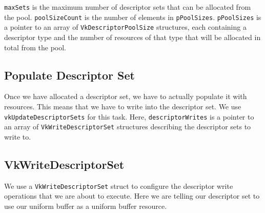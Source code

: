 \texttt{maxSets} is the maximum number of descriptor sets that can be allocated
from the pool.
\texttt{poolSizeCount} is the number of elements in \texttt{pPoolSizes}.
\texttt{pPoolSizes} is a pointer to an array of \texttt{VkDescriptorPoolSize}
structures, each containing a descriptor type and the number of resources
of that type that will be allocated in total from the pool.

\begin{minipage}{\linewidth}{\noindent}
    
\end{minipage}

\subsection{Populate Descriptor Set}

Once we have allocated a descriptor set, we have to actually populate it with
resources.
This means that we have to write into the descriptor set.
We use \texttt{vkUpdateDescriptorSets} for this task.
Here, \texttt{descriptorWrites} is a pointer to an array of
\texttt{VkWriteDescriptorSet} structures describing the descriptor sets
to write to.

\begin{minipage}{\linewidth}{\noindent}
    
\end{minipage}

\subsection{VkWriteDescriptorSet}

We use a \texttt{VkWriteDescriptorSet} struct to configure the descriptor
write operations that we are about to execute.
Here we are telling our descriptor set to use our uniform buffer as a
uniform buffer resource.

\begin{minipage}{\linewidth}{\noindent}
    
\end{minipage}

